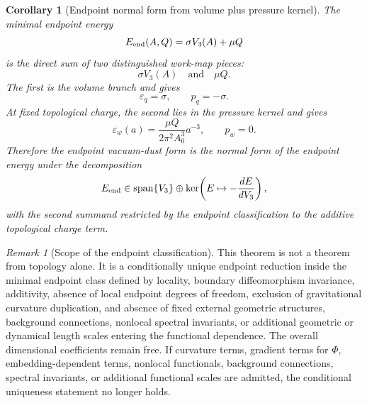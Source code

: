 \documentclass[11pt,a4paper]{article}
\def\dd{d}%
\numberwithin{equation}{section}
\newtheorem{corollary}[criterion]{Corollary}
\theoremstyle{remark}
\newtheorem{remark}[criterion]{Remark}
\newcommand{\dd}{\mathrm{d}}
\begin{document}
\begin{corollary}[Endpoint normal form from volume plus pressure kernel]
The minimal endpoint energy
\begin{equation}
E_{\rm end}(A,Q)=\sigma V_3(A)+\mu Q
\end{equation}
is the direct sum of two distinguished work-map pieces:
\begin{equation}
\sigma V_3(A)
\quad\text{and}\quad
\mu Q.
\end{equation}
The first is the volume branch and gives
\begin{equation}
\varepsilon_q=\sigma,
\qquad
p_q=-\sigma.
\end{equation}
At fixed topological charge, the second lies in the pressure kernel and gives
\begin{equation}
\varepsilon_w(a)=\frac{\mu Q}{2\pi^2A_0^3}a^{-3},
\qquad
p_w=0.
\end{equation}
Therefore the endpoint vacuum-dust form is the normal form of the endpoint energy under the decomposition
\begin{equation}
E_{\rm end}
\in
\operatorname{span}\{V_3\}
\oplus
\ker\!\left(E\mapsto-\frac{\dd E}{\dd V_3}\right),
\end{equation}
with the second summand restricted by the endpoint classification to the additive topological charge term.
\end{corollary}

\begin{remark}[Scope of the endpoint classification]
This theorem is not a theorem from topology alone. It is a conditionally unique endpoint reduction inside the minimal endpoint class defined by locality, boundary diffeomorphism invariance, additivity, absence of local endpoint degrees of freedom, exclusion of gravitational curvature duplication, and absence of fixed external geometric structures, background connections, nonlocal spectral invariants, or additional geometric or dynamical length scales entering the functional dependence. The overall dimensional coefficients remain free. If curvature terms, gradient terms for \(\Phi\), embedding-dependent terms, nonlocal functionals, background connections, spectral invariants, or additional functional scales are admitted, the conditional uniqueness statement no longer holds.
\end{remark}
\end{document}
